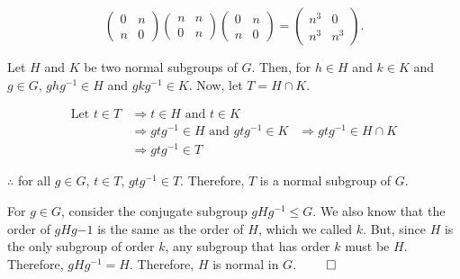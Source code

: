 \documentclass[12pt]{report}
\begin{document}
\begin{enumerate}[label=\alph*.]
    $$\begin{pmatrix}
        0 & n \\ n & 0
    \end{pmatrix}\begin{pmatrix}
        n & n \\ 0 & n
    \end{pmatrix}\begin{pmatrix}
        0 & n \\ n & 0
    \end{pmatrix} = \begin{pmatrix}
        n^3 & 0 \\ n^3 & n^3
    \end{pmatrix}.$$
    

\end{enumerate}

\sol Let $H$ and $K$ be two normal subgroups of $G$. Then, for $h \in H$ and $k \in K$ and $g \in G$, $ghg^{-1} \in H$ and $gkg^{-1} \in K$. Now, let $T = H \cap K$. 

\begin{align*}
    \text{Let } t \in T & \Rightarrow t \in H \text{ and  }t \in K \\
    & \Rightarrow gtg^{-1} \in H \text{ and } gtg^{-1} \in K
    & \Rightarrow gtg^{-1} \in H \cap K \\
    & \Rightarrow gtg^{-1} \in T
\end{align*}

$\therefore$ for all $g \in G$, $t\in T$, $gtg^{-1} \in T$. Therefore, $T$ is a normal subgroup of $G$.


\sol For $g \in G$, consider the conjugate subgroup $gHg^{-1} \leq G$. We also know that the order of $gHg{-1}$ is the same as the order of $H$, which we called $k$. But, since $H$ is the only subgroup of order $k$, any subgroup that has order $k$ must be $H$. Therefore, $gHg^{-1} = H$. Therefore, $H$ is normal in $G$. $\qed$
\end{document}
